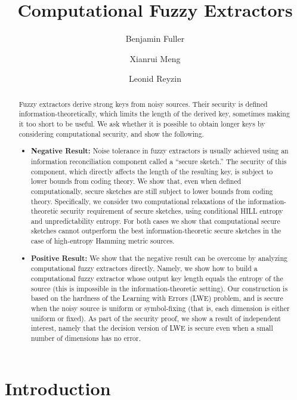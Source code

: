 \documentclass[11pt]{article}
\title{\textbf{Computational Fuzzy Extractors}}
\author{Benjamin Fuller%
 \and Xianrui Meng \and Leonid Reyzin}
\begin{document}
\maketitle


\begin{abstract} 
Fuzzy extractors derive strong keys from noisy sources.  Their
security is defined information-theoretically, which limits the length
of the derived key, sometimes making it too short to be useful. We ask
whether it is possible to obtain longer keys by considering
computational security, and show the following.

\begin{itemize}
\item\textbf{Negative Result:} Noise tolerance in fuzzy extractors is usually
achieved using an information reconciliation component called a ``secure
sketch.'' The security of this component, which directly affects the
length of the resulting key, is subject to lower bounds from coding
theory.  We show that, even when defined computationally, secure
sketches are still subject to lower bounds from coding theory. Specifically, we consider
two computational relaxations of the information-theoretic security requirement of secure sketches, using conditional HILL entropy and unpredictability entropy. For both cases we show  that computational secure sketches cannot outperform the best information-theoretic secure sketches in the case of high-entropy Hamming metric sources.

\item\textbf{Positive Result:} We show that the negative result can be overcome by
analyzing computational fuzzy extractors directly.  Namely, we show
how to build a computational fuzzy extractor whose output key length
equals the entropy of the source (this is impossible in the
information-theoretic setting). Our construction is based on the
hardness of the Learning with Errors (LWE) problem, and is secure when
the noisy source is uniform or symbol-fixing (that is, each dimension
is either uniform or fixed). As part of the security proof, we show a result of independent interest, namely
that the decision version of LWE is secure even when a small number of
dimensions has no error.
\end{itemize}
\end{abstract}

\newcommand{\M}{\mathcal{M}}
\section{Introduction}\label{sec:introduction}
\end{document}
